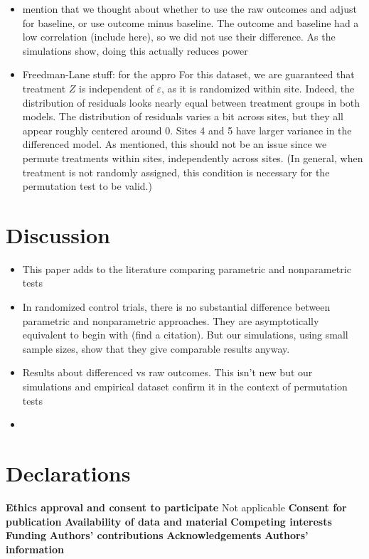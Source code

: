 \documentclass[11pt]{article}
\newcommand{\bit}{\begin{itemize}}
\newcommand{\eit}{\end{itemize}}
\begin{document}
\bit
\item mention that we thought about whether to use the raw outcomes and adjust for baseline, or use outcome minus baseline. The outcome and baseline had a low correlation (include here), so we did not use their difference. As the simulations show, doing this actually reduces power
\item Freedman-Lane stuff: for the appro
For this dataset, we are guaranteed that treatment $Z$ is independent of $\varepsilon$, as it is randomized within site.
Indeed, the distribution of residuals looks nearly equal between treatment groups in both models.
The distribution of residuals varies a bit across sites, but they all appear roughly centered around 0.
Sites 4 and 5 have larger variance in the differenced model.
As mentioned, this should not be an issue since we permute treatments within sites, independently across sites.
(In general, when treatment is not randomly assigned, this condition is necessary for the permutation test to be valid.)
\eit

\begin{center}

\end{center}

\section{Discussion}

\bit
\item This paper adds to the literature comparing parametric and nonparametric tests
\item In randomized control trials, there is no substantial difference between parametric and nonparametric approaches.  They are asymptotically equivalent to begin with (find a citation). But our simulations, using small sample sizes, show that they give comparable results anyway.
\item Results about differenced vs raw outcomes. This isn't new but our simulations and empirical dataset confirm it in the context of permutation tests
\item 
\eit



\section{Declarations}
\textbf{Ethics approval and consent to participate}
Not applicable
\textbf{Consent for publication}
\textbf{Availability of data and material}
\textbf{Competing interests}
\textbf{Funding}
\textbf{Authors' contributions}
\textbf{Acknowledgements}
\textbf{Authors' information}



\end{document}
